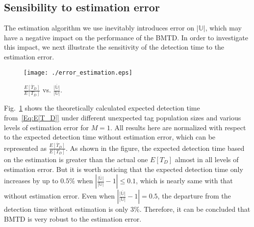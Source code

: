\documentclass[10pt, twocolumn]{IEEEtran}
\begin{document}
\subsection{Sensibility to estimation error}

The estimation algorithm we use inevitably introduces error on $|\mathbb{U}|$, which may have a negative impact on the performance of the BMTD. In order to investigate this impact, we next illustrate the sensitivity of the detection time to the estimation error.

\begin{figure}[htbp]
\centering
\centering
\texttt{[image: ./error\_estimation.eps]}
\caption{$\frac{\overline {E[{T_D}]}}{E[T_D]}$ vs. $\frac{\overline{|\mathbb{U}|}}{|\mathbb{U}|}$.}
\label{Fig:error_estimation}
\end{figure}
\begin{comment}
\begin{figure}[htbp]
\centering
\begin{minipage}[t]{0.49\linewidth}
\centering
\texttt{[image: ./error\_estimation.eps]}
\caption{$\frac{\overline {E[{T_D}]}}{E[T_D]}$ vs. $\frac{\overline{|\mathbb{U}|}}{|\mathbb{U}|}$.}
\label{Fig:error_estimation}
\end{minipage}
\begin{minipage}[t]{0.49\linewidth}
\centering
\texttt{[image: ./P\_D\_SRC.eps]}
\caption{$q_{pre}$ vs. $m$.}
\label{Fig:SRC}
\end{minipage}
\end{figure}
\end{comment}

Fig.~\ref{Fig:error_estimation} shows the theoretically calculated expected detection time from~\eqref{Eq:E[T_D]} under different unexpected tag population sizes and various levels of estimation error for $M=1$. All results here are normalized with respect to the expected detection time without estimation error, which can be represented as $\frac{\overline {E[{T_D}]}}{E[T_D]}$. As shown in the figure, the expected detection time based on the estimation is greater than the actual one ${E[T_D]}$ almost in all levels of estimation error. But it is worth noticing that the expected detection time only increases by up to $0.5\%$ when $|{\frac{\overline{|\mathbb{U}|}}{|\mathbb{U}|}-1}| \le 0.1$, which is nearly same with that without estimation error. Even when $|{\frac{\overline{|\mathbb{U}|}}{|\mathbb{U}|}-1}| = 0.5$, the departure from the detection time without estimation is only $3\%$. Therefore, it can be concluded that BMTD is very robust to the estimation error.
\end{document}
